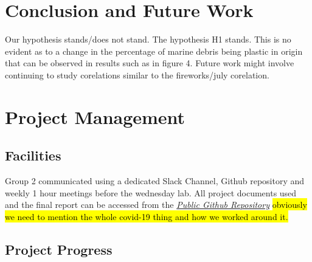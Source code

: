 \documentclass[10pt]{article}\usepackage[]{graphicx}\usepackage[]{color}
\begin{document}
\section{Conclusion and Future Work}\label{cdsmote1}

Our hypothesis stands/does not stand.
The hypothesis H1 stands. This is no evident as to a change in the percentage of marine debris being plastic in origin that can be observed in results such as in figure 4.  
Future work might involve continuing to study corelations similar to the fireworks/july corelation.  







\pagebreak
\section{Project Management}\label{mgt}
\subsection{Facilities}
Group 2 communicated using a dedicated Slack Channel, Github repository and weekly 1 hour meetings before the wednesday lab.
All project documents used and the final report can be accessed from the \textit{\href{https://github.com/KarenJewell/CMM507Group2}{Public Github Repository}}
\hl{obviously we need to mention the whole covid-19 thing and how we worked around it.}

\subsection{Project Progress}
\end{document}

